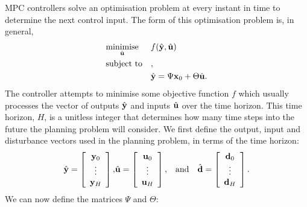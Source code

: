 MPC controllers solve an optimisation problem at every instant in time to determine the next control input.
The form of this optimisation problem is, in general,
\begin{equation}
	\label{eq:mpc-opt}
	\optimise
		{minimise}{\hvec{u}}
		{f(\hvec{y}, \hvec{u})}
		{\hvec{y} = \Psi \vec{x}_0 + \Theta \hvec{u}}
\end{equation}
The controller attempts to minimise some objective function $f$ which usually processes the vector of outputs $\hat{\mathbf{y}}$ and inputs $\hat{\mathbf{u}}$ over the time horizon.
This time horizon, $H$, is a unitless integer that determines how many time steps into the future the planning problem will consider.
We first define the output, input and disturbance vectors used in the planning problem, in terms of the time horizon:
\begin{eqnarray}
	\label{eq:mpc-vectors}
	\hat{\mathbf{y}} = \left[\begin{array}{c}
		\mathbf{y}_0 \\
		\vdots \\
		\mathbf{y}_H
	\end{array}\right],
	&
	\hat{\mathbf{u}} = \left[\begin{array}{c}
		\mathbf{u}_0 \\
		\vdots \\
		\mathbf{u}_H
	\end{array}\right],
	& \text{and} \quad
	\hat{\mathbf{d}} = \left[\begin{array}{c}
		\mathbf{d}_0 \\
		\vdots \\
		\mathbf{d}_H
	\end{array}\right].
\end{eqnarray}
We can now define the matrices $\Psi$ and $\Theta$:

